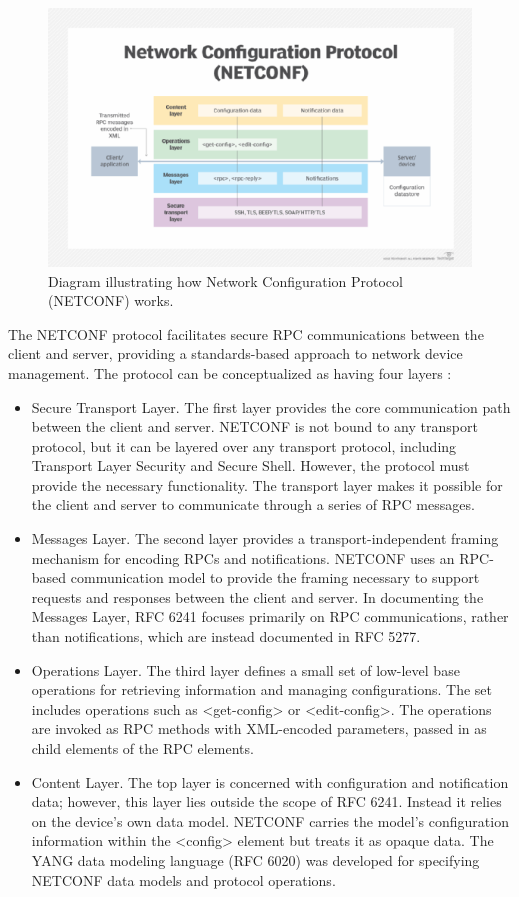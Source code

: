 \begin{figure}[!ht]
    \centering
    \includegraphics[width=\linewidth]{Images/network_configuration_protocol-f_mobile.png}
    \caption{Diagram illustrating how Network Configuration Protocol (NETCONF) works.}
    \label{fig:example}
\end{figure}

The NETCONF protocol facilitates secure RPC communications between the client and server, providing a standards-based approach to network device management. The protocol can be conceptualized as having four layers  :

\begin{itemize}
    \item Secure Transport Layer. The first layer provides the core communication path between the client and server. NETCONF is not bound to any transport protocol, but it can be layered over any transport protocol, including Transport Layer Security and Secure Shell. However, the protocol must provide the necessary functionality. The transport layer makes it possible for the client and server to communicate through a series of RPC messages.
    \item Messages Layer. The second layer provides a transport-independent framing mechanism for encoding RPCs and notifications. NETCONF uses an RPC-based communication model to provide the framing necessary to support requests and responses between the client and server. In documenting the Messages Layer, RFC 6241 focuses primarily on RPC communications, rather than notifications, which are instead documented in RFC 5277.
    \item Operations Layer. The third layer defines a small set of low-level base operations for retrieving information and managing configurations. The set includes operations such as <get-config> or <edit-config>. The operations are invoked as RPC methods with XML-encoded parameters, passed in as child elements of the RPC elements.
    \item Content Layer. The top layer is concerned with configuration and notification data; however, this layer lies outside the scope of RFC 6241. Instead it relies on the device's own data model. NETCONF carries the model's configuration information within the <config> element but treats it as opaque data. The YANG data modeling language (RFC 6020) was developed for specifying NETCONF data models and protocol operations.
\end{itemize}

